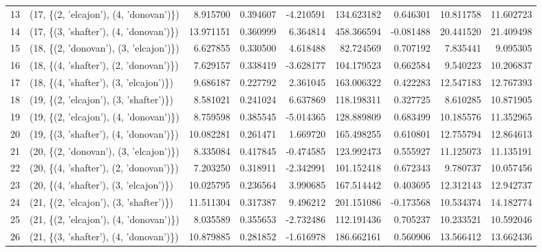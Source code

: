 \begin{tabular}{llrrrrrrr}
13 &  (17, \{(2, 'elcajon'), (4, 'donovan')\}) &   8.915700 &  0.394607 &  -4.210591 &  134.623182 &  0.646301 &  10.811758 &  11.602723 \\
14 &  (17, \{(3, 'shafter'), (4, 'donovan')\}) &  13.971151 &  0.360999 &   6.364814 &  458.366594 & -0.081488 &  20.441520 &  21.409498 \\
15 &  (18, \{(2, 'donovan'), (3, 'elcajon')\}) &   6.627855 &  0.330500 &   4.618488 &   82.724569 &  0.707192 &   7.835441 &   9.095305 \\
16 &  (18, \{(4, 'shafter'), (2, 'donovan')\}) &   7.629157 &  0.338419 &  -3.628177 &  104.179523 &  0.662584 &   9.540223 &  10.206837 \\
17 &  (18, \{(4, 'shafter'), (3, 'elcajon')\}) &   9.686187 &  0.227792 &   2.361045 &  163.006322 &  0.422283 &  12.547183 &  12.767393 \\
18 &  (19, \{(2, 'elcajon'), (3, 'shafter')\}) &   8.581021 &  0.241024 &   6.637869 &  118.198311 &  0.327725 &   8.610285 &  10.871905 \\
19 &  (19, \{(2, 'elcajon'), (4, 'donovan')\}) &   8.759598 &  0.385545 &  -5.014365 &  128.889809 &  0.683499 &  10.185576 &  11.352965 \\
20 &  (19, \{(3, 'shafter'), (4, 'donovan')\}) &  10.082281 &  0.261471 &   1.669720 &  165.498255 &  0.610801 &  12.755794 &  12.864613 \\
21 &  (20, \{(2, 'donovan'), (3, 'elcajon')\}) &   8.335084 &  0.417845 &  -0.474585 &  123.992473 &  0.555927 &  11.125073 &  11.135191 \\
22 &  (20, \{(4, 'shafter'), (2, 'donovan')\}) &   7.203250 &  0.318911 &  -2.342991 &  101.152418 &  0.672343 &   9.780737 &  10.057456 \\
23 &  (20, \{(4, 'shafter'), (3, 'elcajon')\}) &  10.025795 &  0.236564 &   3.990685 &  167.514442 &  0.403695 &  12.312143 &  12.942737 \\
24 &  (21, \{(2, 'elcajon'), (3, 'shafter')\}) &  11.511304 &  0.317387 &   9.496212 &  201.151086 & -0.173568 &  10.534374 &  14.182774 \\
25 &  (21, \{(2, 'elcajon'), (4, 'donovan')\}) &   8.035589 &  0.355653 &  -2.732486 &  112.191436 &  0.705237 &  10.233521 &  10.592046 \\
26 &  (21, \{(3, 'shafter'), (4, 'donovan')\}) &  10.879885 &  0.281852 &  -1.616978 &  186.662161 &  0.560906 &  13.566412 &  13.662436 \\
\bottomrule
\end{tabular}
